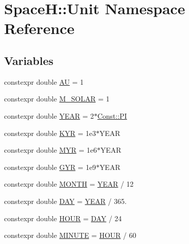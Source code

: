 \hypertarget{namespace_space_h_1_1_unit}{}\section{SpaceH\+:\+:Unit Namespace Reference}
\label{namespace_space_h_1_1_unit}
\subsection*{Variables}
\begin{DoxyCompactItemize}
\item 
constexpr double \mbox{\hyperlink{namespace_space_h_1_1_unit_a3851fdb2c14e9823ba0a46b68f99d6f9}{AU}} = 1
\item 
constexpr double \mbox{\hyperlink{namespace_space_h_1_1_unit_a65df0928124a0990520fda009dbfd3e4}{M\+\_\+\+S\+O\+L\+AR}} = 1
\item 
constexpr double \mbox{\hyperlink{namespace_space_h_1_1_unit_a386ecd4744a86ce94e14270b1305fc62}{Y\+E\+AR}} = 2$\ast$\mbox{\hyperlink{namespace_space_h_1_1_const_afdcc70c6f78ec4cf7baad3525ba7c618}{Const\+::\+PI}}
\item 
constexpr double \mbox{\hyperlink{namespace_space_h_1_1_unit_a92db3086d9b968f2931b81b4c31cf587}{K\+YR}} = 1e3$\ast$\+Y\+E\+AR
\item 
constexpr double \mbox{\hyperlink{namespace_space_h_1_1_unit_a6d4784385a7314879a24cf69b8e0d434}{M\+YR}} = 1e6$\ast$\+Y\+E\+AR
\item 
constexpr double \mbox{\hyperlink{namespace_space_h_1_1_unit_a41d9004e5902ee96826af6512c6819c4}{G\+YR}} = 1e9$\ast$\+Y\+E\+AR
\item 
constexpr double \mbox{\hyperlink{namespace_space_h_1_1_unit_ad38d8884159cb621872ee7587073b529}{M\+O\+N\+TH}} = \mbox{\hyperlink{namespace_space_h_1_1_unit_a386ecd4744a86ce94e14270b1305fc62}{Y\+E\+AR}} / 12
\item 
constexpr double \mbox{\hyperlink{namespace_space_h_1_1_unit_a1f85dcd972f4336bccee277f6bb2654c}{D\+AY}} = \mbox{\hyperlink{namespace_space_h_1_1_unit_a386ecd4744a86ce94e14270b1305fc62}{Y\+E\+AR}} / 365.
\item 
constexpr double \mbox{\hyperlink{namespace_space_h_1_1_unit_a3a80e4b127a3d63688a18077d0d47bee}{H\+O\+UR}} = \mbox{\hyperlink{namespace_space_h_1_1_unit_a1f85dcd972f4336bccee277f6bb2654c}{D\+AY}} / 24
\item 
constexpr double \mbox{\hyperlink{namespace_space_h_1_1_unit_a581da52233fafb94663eb4e8377b4b5a}{M\+I\+N\+U\+TE}} = \mbox{\hyperlink{namespace_space_h_1_1_unit_a3a80e4b127a3d63688a18077d0d47bee}{H\+O\+UR}} / 60

\end{DoxyCompactItemize}
